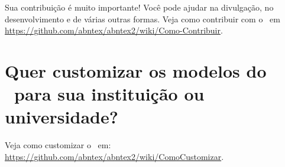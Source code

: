 Sua contribuição é muito importante! Você pode ajudar na divulgação, no
desenvolvimento e de várias outras formas. Veja como contribuir com o \abnTeX\
em \url{https://github.com/abntex/abntex2/wiki/Como-Contribuir}.

\section{Quer customizar os modelos do \abnTeX\ para sua instituição ou
  universidade?}

Veja como customizar o \abnTeX\ em:
\url{https://github.com/abntex/abntex2/wiki/ComoCustomizar}.


